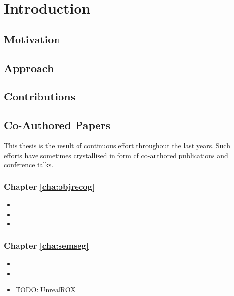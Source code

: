 \chapter{Introduction}
\label{cha:introduction}

\lipsum[10]
\lipsum[10]
\lipsum[10]
\lipsum[10]
\lipsum[10]
\lipsum[10]
\lipsum[10]
\lipsum[10]
\lipsum[10]
\lipsum[10]

\section{Motivation}
\label{cha:introduction:sec:motivation}

\section{Approach}
\label{cha:introduction:sec:approach}

\section{Contributions}
\label{cha:introduction:sec:contributions}

\section{Co-Authored Papers}
\label{cha:introduction:sec:papers}

This thesis is the result of continuous effort throughout the last years. Such efforts have sometimes crystallized in form of co-authored publications and conference talks.

\subsection{Chapter \ref{cha:objrecog}}

\begin{itemize}
  \item {}
  \item {}
  \item {}
\end{itemize}

\subsection{Chapter \ref{cha:semseg}}

\begin{itemize}
  \item {}
  \item {}
  \item TODO: UnrealROX
\end{itemize}

